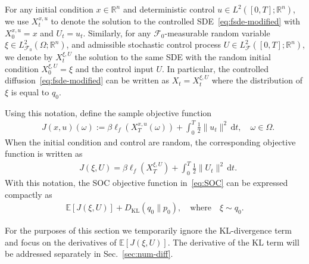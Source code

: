 \documentclass[letterpaper, 10 pt, conference]{ieeeconf}  %
\def\Re{\mathbb{R}}
\newcommand{\field}[1]{\mathbb{#1}}
\def\Re{\field{R}}
\def\Expect{{\mathbb E}}
\newcommand{\ud}{\,\mathrm{d}}
\def\Re{\mathbb{R}}
\renewcommand{\Re}{\mathbb{R}}
\newcommand{\F}{{\mathcal F}}
\begin{document}
For any initial condition $x\in \mathbb R^n$ and deterministic control $u \in L^2([0,T];\Re^n)$, we use $X^{x,u}_t$ to denote the solution to the controlled SDE~\eqref{eq:fsde-modified} with $X^{x,u}_0=x$ and  $U_t=u_t$. Similarly, for any  $\mathcal F_0$-measurable random variable $\xi \in L^2_{\F_0}(\Omega;\Re^n)$, and  admissible stochastic control process  $U \in L^2_{\mathcal F}([0,T];\Re^n)$,  we denote by $X^{\xi,U}_t$ the solution to the same SDE with the random initial condition $X^{\xi,U}_0=\xi$ and the control input $U$. In particular, the controlled diffusion~\eqref{eq:fsde-modified} can be written as $X_t=X^{\xi,U}_t$ where the distribution of $\xi$ is equal to $q_0$. 

Using this notation, define  the sample objective function 
\begin{align*}
 &J(x,u)(\omega) :=  \beta \ell_f(X^{x,u}_T(\omega)) + \int_0^T \frac{1}{2} \|u_t\|^2 \ud t, \quad \omega \in \Omega.
\end{align*}
When the initial condition and control are random, the corresponding objective function is written as
\begin{align*}
 &J(\xi,U) =  \beta \ell_f(X^{\xi,U}_T) + \int_0^T \frac{1}{2} \|U_t\|^2 \ud t. 
\end{align*}
With this notation, the SOC objective function in~\eqref{eq:SOC} can be expressed compactly as
\begin{align*}
\Expect[ J(\xi,U)]  +  D_\mathrm{KL}(q_0\|p_0),\quad \text{where}\quad \xi \sim q_0.
\end{align*}


For the purposes of this section we temporarily ignore the KL-divergence term and focus on the derivatives of $\mathbb E[J(\xi,U)]$.  The derivative of the KL term will be addressed separately in Sec.~\ref{sec:num-diff}. 
\end{document}
